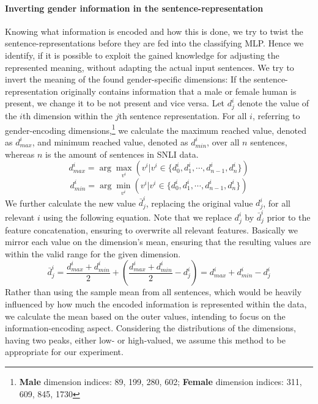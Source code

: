 \paragraph*{Inverting gender information in the sentence-representation}
Knowing what information is encoded and how this is done, we try to twist the sentence-representations before they are fed into the classifying \ac{MLP}. Hence we identify, if it is possible to exploit the gained knowledge for adjusting the represented meaning, without adapting the actual input sentences. We try to invert the meaning of the found gender-specific dimensions: If the sentence-representation originally contains information that a male or female human is present, we change it to be not present and vice versa. Let $d^i_j$ denote the value of the $i$th dimension within the $j$th sentence representation. For all $i$, referring to gender-encoding dimensions,\footnote{\textbf{Male} dimension indices: 89, 199, 280, 602; \textbf{Female} dimension indices: 311, 609, 845, 1730} we calculate the maximum reached value, denoted as $d^i_{max}$, and minimum reached value, denoted as $d^i_{min}$, over all $n$ sentences, whereas $n$ is the amount of sentences in \ac{SNLI} data.
\begin{equation}
d^i_{max} = \arg\max_{v^i}(v^i | v^i \in \{d^i_0, d^i_1, \cdots,d^i_{n-1}, d^i_n\})
\end{equation}
\begin{equation}
d^i_{min} = \arg\min_{v^i}(v^i | v^i \in \{d^i_0, d^i_1, \cdots,d^i_{n-1}, d^i_n\})
\end{equation}
We further calculate the new value $\bar{d}^i_j$, replacing the original value $d^i_j$, for all relevant $i$ using the following equation. Note that we replace $d^i_j$ by $\bar{d}^i_j$ prior to the feature concatenation, ensuring to overwrite all relevant features. Basically we mirror each value on the dimension's mean, ensuring that the resulting values are within the valid range for the given dimension.
\begin{equation}\label{eq:invert}
\bar{d}^i_j = \frac{d^i_{max} + d^i_{min}}{2} + \left(\frac{d^i_{max} + d^i_{min}}{2} - d^i_j\right) = d^i_{max} + d^i_{min} - d^i_j
\end{equation}
Rather than using the sample mean from all sentences, which would be heavily influenced by how much the encoded information is represented within the data, we calculate the mean based on the outer values, intending to focus on the information-encoding aspect. Considering the distributions of the dimensions, having two peaks, either low- or high-valued, we assume this method to be appropriate for our experiment.

